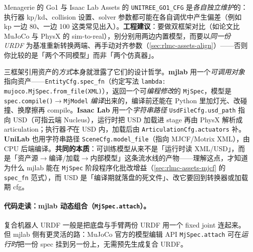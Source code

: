 
\begin{insight}\label{ins:rlmc-assets-zoo-mismatch}
Menagerie 的 Go1 与 Isaac Lab Assets 的 \texttt{UNITREE\_GO1\_CFG} 是\emph{各自独立维护}的：执行器 kp/kd、collision 设置、solver 参数都可能在各自调优中产生偏差（例如 kp 一边 80、一边 100 这类常见出入）。\textbf{工程建议}：要做双框架对比（如论文比 MuJoCo 与 PhysX 的 sim-to-real），别分别用两边内置模型，而要以\emph{同一份 URDF} 为基准重新转换两端、再手动对齐参数（\cref{sec:rlmc-assets-align}）——否则你比较的是「两个不同模型」而非「两个仿真器」。
\end{insight}

\begin{insight}\label{ins:rlmc-assets-compiled}
三框架引用资产的\emph{方式}本身就泄露了它们的设计哲学。\textbf{mjlab} 用一个\emph{可调用对象}指向资产——\texttt{EntityCfg.spec\_fn}（约定写法 \verb|lambda: mujoco.MjSpec.from_file(XML)|），返回一个可\emph{编程修改}的 \texttt{MjSpec}，模型是 \texttt{spec.compile()$\to$MjModel} \emph{编译}出来的，编译前还能在 Python 里加灯光、改碰撞、换摩擦再 compile。\textbf{Isaac Lab} 用一个\emph{字符串路径} \texttt{UsdFileCfg.usd\_path} 指向 USD（可指云端 Nucleus），运行时把 USD 加载进 stage 再由 PhysX 解析成 articulation；执行器\emph{不}在 USD 内，加载后由 \texttt{ArticulationCfg.actuators} 补。\textbf{UniLab} 也用字符串路径 \texttt{SceneCfg.model\_file}（指向 MJCF/Motrix XML），由 CPU 后端编译。\textbf{共同的本质}：可训练模型从来不是「运行时读 XML/USD」，而是「资产源$\to$编译/加载$\to$内部模型」这条流水线的产物——理解这点，才知道为什么 mjlab 能在 \texttt{MjSpec} 阶段程序化批改增益（\cref{sec:rlmc-assets-mjcf} 的 \texttt{spec\_fn} 范式），而 USD 是「编译期就落盘的死文件」、改它要回到转换器或加载期 cfg。
\end{insight}

\paragraph{代码走读：mjlab 动态组合（\texttt{MjSpec.attach}）。}复合机器人 URDF 一般是把底盘与手臂两份 URDF 用一个 fixed joint 连起来。但 mjlab 侧有更灵活的路：MuJoCo 官方的模型编辑 API \texttt{MjSpec.attach} 可在\emph{运行时}把一份 spec 挂到另一份上，无需预先生成复合 URDF。

